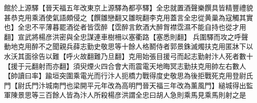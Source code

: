 館於上源驛【晉天福五年改東京上源驛為都亭驛】全忠就置酒聲樂饌具皆精豐禮貌甚恭克用乘酒使氣語頗侵之【饌雛戀翻又雛晥翻李克用蓋言全忠從黄巢為寇觸其實也】全忠不平薄暮罷酒從者皆霑醉【霑醉言飲酒大醉胷襟霑濕不能自持也從才用翻】宣武將楊彦洪密與全忠謀連車樹柵以塞衢路【塞悉則翻】兵圍驛而攻之呼聲動地克用醉不之聞親兵薛志勤史敬思等十餘人格鬭侍者郭景銖滅燭扶克用匿牀下以水沃其面徐告以難【呼火故翻難乃旦翻】克用始張目援弓而起志勤射汴人死者數十【援于元翻射而亦翻】須臾煙火四合會大雨震電天地晦冥志勤扶克用帥左右數人【帥讀曰率】踰垣突圍乘電光而行汴人扼橋力戰得度史敬思為後拒戰死克用登尉氏門【尉氏門汴城南門也梁開平元年改為高明門晉天福三年改為薰風門】縋城得出監軍陳景思等三百餘人皆為汴人所殺楊彦洪謂全忠曰胡人急則乘馬見乘馬則射之是